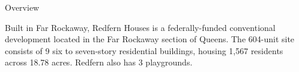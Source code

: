 Overview 

Built in Far Rockaway, Redfern Houses is a federally-funded conventional development located in the Far Rockaway section of Queens. The 604-unit site consists of 9 six to seven-story residential buildings, housing 1,567 residents across 18.78 acres. Redfern also has 3 playgrounds. 